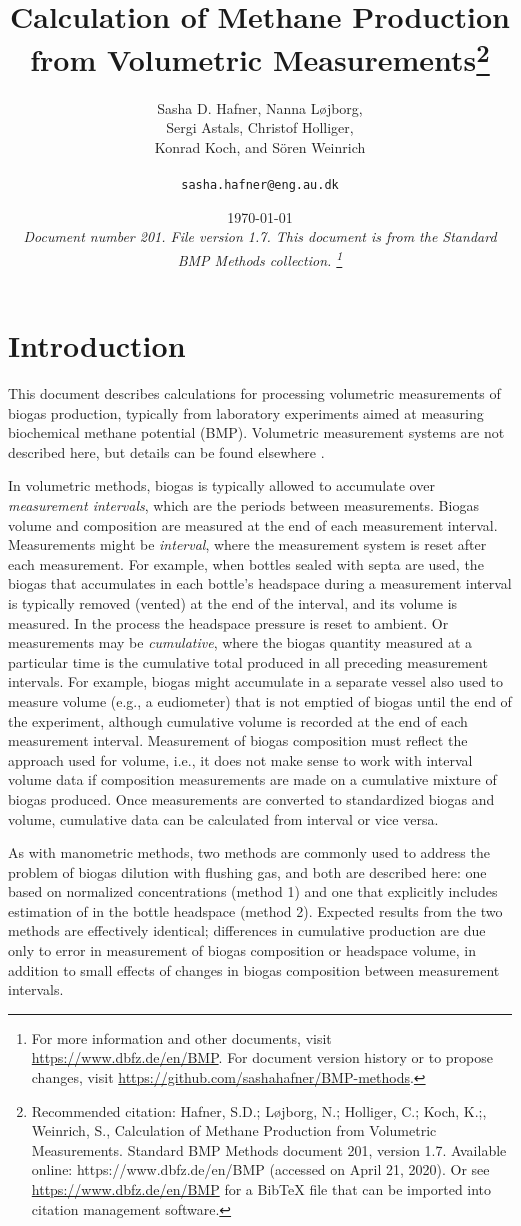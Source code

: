 \documentclass[]{article}
\title {Calculation of Methane Production from Volumetric Measurements\footnote{
  Recommended citation: 
Hafner, S.D.; L\o jborg, N.; Holliger, C.; Koch, K.;, Weinrich, S., Calculation of Methane Production from Volumetric Measurements. Standard BMP Methods document 201, version 1.7. Available online: https://www.dbfz.de/en/BMP (accessed on April 21, 2020).
\newline
  Or see \url{https://www.dbfz.de/en/BMP} for a BibTeX file that can be imported into citation management software.
}}
\author{Sasha D. Hafner, Nanna L\o jborg, \\ Sergi Astals, Christof Holliger, \\ Konrad Koch, and S{\"o}ren Weinrich\\
\\
\texttt{sasha.hafner@eng.au.dk}
}
\date{\today \\
\bigskip
\textit{
  Document number 201.
  File version 1.7. 
  This document is from the Standard BMP Methods collection.
    \footnote{For more information and other documents, visit \url{https://www.dbfz.de/en/BMP}. 
    For document version history or to propose changes, visit \url{https://github.com/sashahafner/BMP-methods}.}
}
}
\begin{document}
\maketitle

\section{Introduction}
This document describes calculations for processing volumetric measurements of biogas production, typically from laboratory experiments aimed at measuring biochemical methane potential (BMP).
Volumetric measurement systems are not described here, but details can be found elsewhere \citep{owenBioassayMonitoringBiochemical1979,rozziMethodsAssessingMicrobial2004,vdiFermentationOrganicMaterials2016}.

In volumetric methods, biogas is typically allowed to accumulate over \textit{measurement intervals}, which are the periods between measurements.
Biogas volume and composition are measured at the end of each measurement interval.
Measurements might be \textit{interval}, where the measurement system is reset after each measurement.
For example, when bottles sealed with septa are used, the biogas that accumulates in each bottle's headspace during a measurement interval is typically removed (vented) at the end of the interval, and its volume is measured. 
In the process the headspace pressure is reset to ambient.
Or measurements may be \textit{cumulative}, where the biogas quantity measured at a particular time is the cumulative total produced in all preceding measurement intervals.
For example, biogas might accumulate in a separate vessel also used to measure volume (e.g., a eudiometer) that is not emptied of biogas until the end of the experiment, although cumulative volume is recorded at the end of each measurement interval.
Measurement of biogas composition must reflect the approach used for volume, i.e., it does not make sense to work with interval volume data if composition measurements are made on a cumulative mixture of biogas produced.
Once measurements are converted to standardized biogas and  volume, cumulative data can be calculated from interval or vice versa.

As with manometric methods, two methods are commonly used to address the problem of biogas dilution with flushing gas, and both are described here: one based on normalized  concentrations (method 1) and one that explicitly includes estimation of  in the bottle headspace (method 2).
Expected results from the two methods are effectively identical; differences in cumulative  production are due only to error in measurement of biogas composition or headspace volume, in addition to small effects of changes in biogas composition between measurement intervals.
\end{document}
